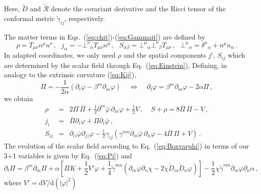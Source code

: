 \documentclass[]{iopart}
\newcommand{\du}{\mathrm{d}}
\begin{document}
%
Here, $\tilde{D}$ and $\tilde{\mathcal{R}}$ denote the covariant
derivative and the Ricci tensor of the conformal metric
$\tilde{\gamma}_{ij}$, respectively.

The matter terms in Eqs.~(\ref{eq:chit})-(\ref{eq:Gammait})
are defined by
%
\begin{equation}
  \rho = T_{\mu\nu}n^{\mu}n^{\nu}\,,~~~
  j_{\alpha} = -\bot^{\nu}{}_{\alpha} T_{\mu\nu} n^{\mu}\,,~~~
  S_{\alpha\beta} = \bot^{\mu}{}_{\alpha} \bot^{\nu}{}_{\beta}
        T_{\mu\nu}\,,~~~
  \bot^{\mu}{}_{\alpha}=\delta^{\mu}{}_{\alpha}+n^{\mu}n_{\alpha}\,.
\end{equation}
%
In adapted coordinates, we only need $\rho$ and
the spatial components $j^i$, $S_{ij}$ which are determined
by the scalar field through Eq.~(\ref{eq:Einstein}),
Defining, in analogy to the extrinsic curvature (\ref{eq:Kij}),
%
\begin{equation}
  \Pi = -\frac{1}{2\alpha}
  (
  \partial_t \varphi - \beta^m \partial_m \varphi
  )
  ~~~~~\Leftrightarrow~~~~~
  \partial_t \varphi = \beta^m\partial_m \varphi-2\alpha \Pi\,,
  \label{eq:Pi}
\end{equation}
%
we obtain
%
\begin{eqnarray}
  \rho &=&
  2\Pi \,\bar{\Pi}
  +\frac{1}{2}\partial^m \bar{\varphi}\,\partial_m\varphi
  +\frac{1}{2}V\,,~~~~~
  S+\rho = 8\bar{\Pi}\,\Pi-V\,, \nonumber \\
  j_i &=&
  \bar{\Pi}\partial_i \varphi
  +\Pi \partial_i \bar{\varphi}\,, \nonumber\\
  S_{ij} &=& \partial_{(i}\bar{\varphi}\partial_{j)}\varphi
  - \frac{1}{2}\gamma_{ij}
  \left(
  \gamma^{mn}\partial_m \bar{\varphi}\,\partial_n \varphi
  -4\bar{\Pi} \,\Pi
  +V
  \right)\,. \label{eqn:projectionofstressenergy}
\end{eqnarray}
%
The evolution of the scalar field according to
Eq.~(\ref{eq:Boxvarphi}) in terms of our 3+1 variables
is given by Eq.~(\ref{eq:Pi}) and
%
\begin{equation}
  \partial_t \Pi =
  \beta^m \partial_m \Pi
  + \alpha
  \left[
  \Pi K
  + \frac{1}{2}V'\varphi
  + \frac{1}{4} \tilde{\gamma}^{mn}
  \left(
  \partial_m \varphi\partial_n\chi
  -2\chi\tilde{D}_m\tilde{D}_n \varphi
  \right)
  \right]
  -\frac{1}{2} \chi\tilde{\gamma}^{mn}\partial_m\varphi
  \partial_n \alpha
  \,,
\end{equation}
%
where $V'=\du V/\du (|\varphi|^2)$
\end{document}
